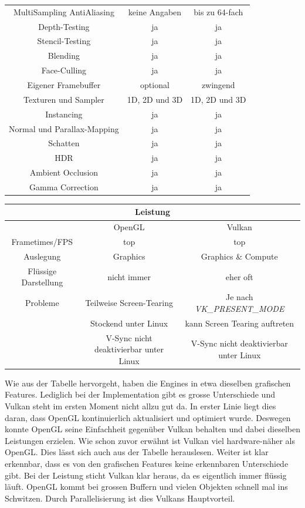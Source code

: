 \documentclass[titlepage, 11pt, a4paper, ngerman]{article}
\begin{document}
\begin{table}[ht]
\begin{tabular}{|c||c|c|}
        \hline
        MultiSampling AntiAliasing & keine Angaben & bis zu 64-fach \\
        Depth-Testing & ja & ja \\
        Stencil-Testing & ja & ja \\
        Blending & ja & ja \\ 
        \gls{Face}-Culling & ja & ja \\
        Eigener Framebuffer & optional & zwingend \\
        Texturen und Sampler & 1D, 2D und 3D & 1D, 2D und 3D \\
        Instancing & ja & ja \\
        Normal und Parallax-Mapping & ja & ja \\
        Schatten & ja & ja \\
        HDR & ja & ja \\
        Ambient Occlusion & ja & ja \\
        Gamma Correction & ja & ja \\
        \hline
    \end{tabular}
    \label{tab:comparison}
\end{table}
\pagebreak
\begin{table}[ht]
    \begin{tabular}{|c||c|c|}
        \hline
        \multicolumn{3}{|c|}{Leistung} \\
        \hline
        \hline
         & \acrshort{OpenGL} & Vulkan \\
        \hline
        \glspl{Frametime}/\acrshort{FPS} & top & top \\
        Auslegung & Graphics & Graphics \& Compute \\
        Flüssige Darstellung & nicht immer & eher oft \\
        Probleme & Teilweise Screen-Tearing & Je nach \textit{VK\_PRESENT\_MODE} \\
         & Stockend unter \gls{Linux} & kann Screen Tearing auftreten \\
         & V-Sync nicht deaktivierbar unter \gls{Linux} & V-Sync nicht deaktivierbar unter \gls{Linux} \\
        \hline
    \end{tabular}
\end{table}
\bigbreak
Wie aus der Tabelle hervorgeht, haben die \glspl{Engine} in etwa dieselben grafischen Features. Lediglich bei der Implementation gibt es grosse Unterschiede und Vulkan steht im ersten Moment nicht allzu gut da. In erster Linie liegt dies daran, dass \acrshort{OpenGL} kontinuierlich aktualisiert und optimiert wurde. Deswegen konnte \acrshort{OpenGL} seine Einfachheit gegenüber Vulkan behalten und dabei dieselben Leistungen erzielen. Wie schon zuvor erwähnt ist Vulkan viel hardware-näher als \acrshort{OpenGL}. Dies lässt sich auch aus der Tabelle herauslesen. Weiter ist klar erkennbar, dass es von den grafischen Features keine erkennbaren Unterschiede gibt. Bei der Leistung sticht Vulkan klar heraus, da es eigentlich immer flüssig läuft. \acrshort{OpenGL} kommt bei grossen Buffern und vielen Objekten schnell mal ins Schwitzen. Durch Parallelisierung ist dies Vulkans Hauptvorteil.\par
\end{document}
